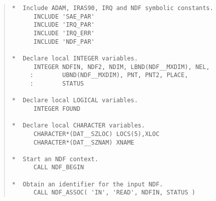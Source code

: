 \begin{quote}
\begin{tabbing} %

\verb#*  Include ADAM, IRAS90, IRQ and NDF symbolic constants.#\\
\verb#      INCLUDE 'SAE_PAR'                                #\\
\verb#      INCLUDE 'IRQ_PAR'                                #\\
\verb#      INCLUDE 'IRQ_ERR'                                #\\
\verb#      INCLUDE 'NDF_PAR'                                #\\
\verb#                                                       #\\
\verb#*  Declare local INTEGER variables.                    #\\
\verb#      INTEGER NDFIN, NDF2, NDIM, LBND(NDF__MXDIM), NEL,#\\
\verb#     :        UBND(NDF__MXDIM), PNT, PNT2, PLACE,      #\\
\verb#     :        STATUS                                   #\\
\verb#                                                       #\\
\verb#*  Declare local LOGICAL variables.                    #\\
\verb#      INTEGER FOUND                                    #\\
\verb#                                                       #\\
\verb#*  Declare local CHARACTER variables.                  #\\
\verb#      CHARACTER*(DAT__SZLOC) LOCS(5),XLOC              #\\
\verb#      CHARACTER*(DAT__SZNAM) XNAME                     #\\
\verb#                                                       #\\
\verb#*  Start an NDF context.                               #\\
\verb#      CALL NDF_BEGIN                                   #\\
\verb#                                                       #\\
\verb#*  Obtain an identifier for the input NDF.             #\\
\verb#      CALL NDF_ASSOC( 'IN', 'READ', NDFIN, STATUS )    #\\

\end{tabbing}
\end{quote}
